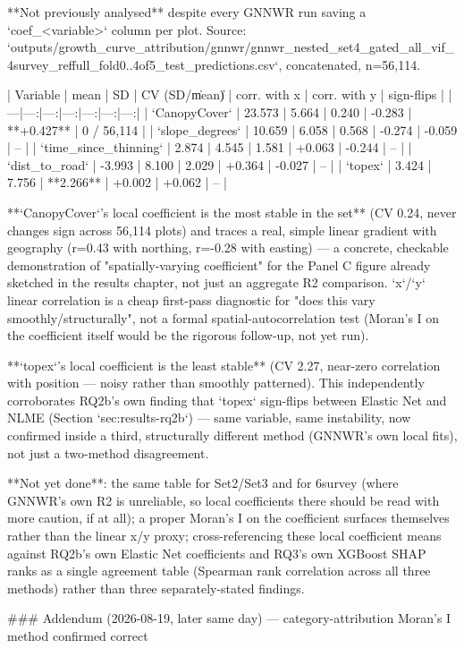 **Not previously analysed** despite every GNNWR run saving a `coef_<variable>` column per plot.
Source: `outputs/growth_curve_attribution/gnnwr/gnnwr_nested_set4_gated_all_vif_4survey_reffull_fold{0..4}of5_test_predictions.csv`,
concatenated, n=56,114.

| Variable | mean | SD | CV (SD/\|mean\|) | corr. with x | corr. with y | sign-flips |
|---|---:|---:|---:|---:|---:|---:|
| `CanopyCover` | 23.573 | 5.664 | 0.240 | -0.283 | **+0.427** | 0 / 56,114 |
| `slope_degrees` | 10.659 | 6.058 | 0.568 | -0.274 | -0.059 | -- |
| `time_since_thinning` | 2.874 | 4.545 | 1.581 | +0.063 | -0.244 | -- |
| `dist_to_road` | -3.993 | 8.100 | 2.029 | +0.364 | -0.027 | -- |
| `topex` | 3.424 | 7.756 | **2.266** | +0.002 | +0.062 | -- |

**`CanopyCover`'s local coefficient is the most stable in the set** (CV 0.24, never changes sign
across 56,114 plots) and traces a real, simple linear gradient with geography (r=0.43 with
northing, r=-0.28 with easting) — a concrete, checkable demonstration of "spatially-varying
coefficient" for the Panel C figure already sketched in the results chapter, not just an aggregate
R2 comparison. `x`/`y` linear correlation is a cheap first-pass diagnostic for "does this vary
smoothly/structurally", not a formal spatial-autocorrelation test (Moran's I on the coefficient
itself would be the rigorous follow-up, not yet run).

**`topex`'s local coefficient is the least stable** (CV 2.27, near-zero correlation with position
— noisy rather than smoothly patterned). This independently corroborates RQ2b's own finding that
`topex` sign-flips between Elastic Net and NLME (Section `sec:results-rq2b`) — same variable,
same instability, now confirmed inside a third, structurally different method (GNNWR's own local
fits), not just a two-method disagreement.

**Not yet done**: the same table for Set2/Set3 and for 6survey (where GNNWR's own R2 is
unreliable, so local coefficients there should be read with more caution, if at all); a proper
Moran's I on the coefficient surfaces themselves rather than the linear x/y proxy; cross-referencing
these local coefficient means against RQ2b's own Elastic Net coefficients and RQ3's own XGBoost
SHAP ranks as a single agreement table (Spearman rank correlation across all three methods) rather
than three separately-stated findings.

### Addendum (2026-08-19, later same day) — category-attribution Moran's I method confirmed correct

